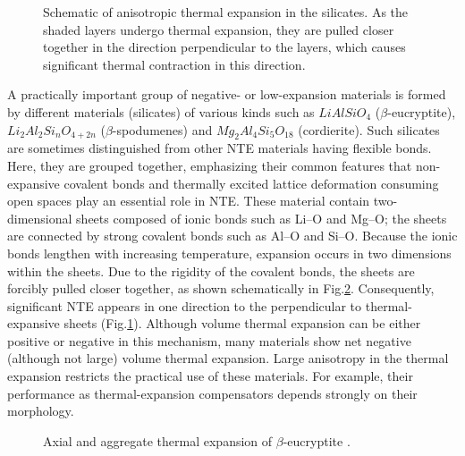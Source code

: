 \documentclass[10pt, a4paper, twocolumn]{article}
\begin{document}
\begin{figure}[h!]
\caption{Schematic of anisotropic thermal expansion in the silicates. As the shaded layers undergo thermal expansion, they are pulled closer together in the direction perpendicular to the layers, which causes significant thermal contraction in this direction.}
\label{ris2}
\end{figure}

A practically important group of negative- or low-expansion materials is formed by different materials (silicates) of various kinds such as $LiAlSiO_4$ ($\beta$-eucryptite)\cite{lit6}, $Li_2Al_2Si_nO_{4+2n}$ ($\beta$-spodumenes) \cite{lit4} and $Mg_2Al_4Si_5O_{18}$ (cordierite)\cite{lit2}. Such silicates are sometimes distinguished from other NTE materials having flexible bonds\cite{lit5}. Here, they are grouped together, emphasizing their common features that non-expansive covalent bonds and thermally excited lattice deformation consuming open spaces play an essential role in NTE. These material contain two-dimensional sheets composed of ionic bonds such as Li–O and Mg–O; the sheets are connected by strong covalent bonds such as Al–O and Si–O. Because the ionic bonds lengthen with increasing temperature, expansion occurs in two dimensions within the sheets. Due to the rigidity of the covalent bonds, the sheets are forcibly pulled closer together, as shown schematically in Fig.\ref{ris1}. Consequently, significant NTE appears in one direction to the perpendicular to thermal-expansive sheets (Fig.\ref{ris2}). Although volume thermal expansion can be either positive or negative in this mechanism, many materials show net negative (although not large) volume thermal expansion. Large anisotropy in the thermal expansion restricts the practical use of these materials. For example, their performance as thermal-expansion compensators depends strongly on their morphology\cite{lit1}.
\begin{figure}[h!]
\caption{Axial and aggregate thermal expansion of $\beta$-eucryptite \cite{lit6}.}
\label{ris1}
\end{figure}
\end{document}
